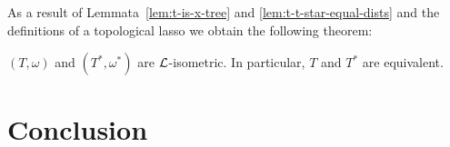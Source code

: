As a result of Lemmata~\ref{lem:t-is-x-tree} and
\ref{lem:t-t-star-equal-dists} and the definitions of a topological lasso we
obtain the following theorem:

\begin{thm}
  \label{thm:t-t-star-l-isometric}
  $(T,\omega)$ and $(T^*,\omega^*)$ are ${\mathcal L}$-isometric.  In particular, $T$
  and $T^*$ are equivalent.
\end{thm}

\section{Conclusion}
\label{sec:conclusion-dist}



